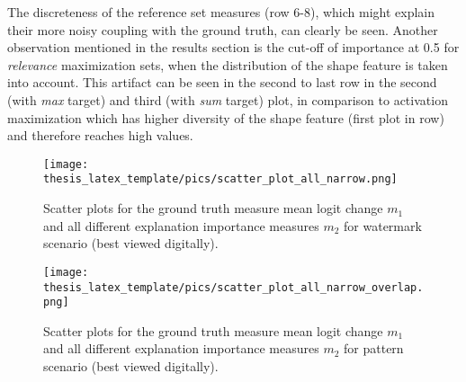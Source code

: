 The discreteness of the reference set measures (row 6-8), which might explain their more noisy coupling with the ground truth, can clearly be seen. Another observation mentioned in the results section is the cut-off of importance at 0.5 for \textit{relevance} maximization sets, when the distribution of the shape feature is taken into account. This artifact can be seen in the second to last row in the second (with \textit{max} target) and third (with \textit{sum} target) plot, in comparison to activation maximization which has higher diversity of the shape feature (first plot in row) and therefore reaches high values. 

\begin{figure}[!htb]
	\centering
	\label{fig:scatter_plot_watermark}
	\texttt{[image: thesis\_latex\_template/pics/scatter\_plot\_all\_narrow.png]}
	\caption[Correlation $m_1, m_2$ Watermark Scenario]{Scatter plots for the ground truth measure mean logit change $m_1$ and all different explanation importance measures $m_2$ for watermark scenario
 (best viewed digitally). }
\end{figure}

\begin{figure}[!htb]
	\centering
	\label{fig:scatter_plot_pattern}
	\texttt{[image: thesis\_latex\_template/pics/scatter\_plot\_all\_narrow\_overlap.png]}
	\caption[Correlation $m_1, m_2$ Pattern Scenario]{Scatter plots for the ground truth measure mean logit change $m_1$ and all different explanation importance measures $m_2$ for pattern scenario (best viewed digitally).}
\end{figure}